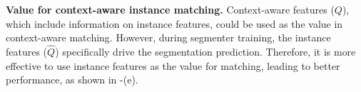 \documentclass[10pt,twocolumn,letterpaper]{article}
\begin{document}
\textbf{Value for context-aware instance matching.}
Context-aware features ($Q$), which include information on instance features, could be used as the value in context-aware matching. However, during segmenter training, the instance features ($\hat{Q}$) specifically drive the segmentation prediction. Therefore, it is more effective to use instance features as the value for matching, leading to better performance, as shown in -(e).





\end{document}
